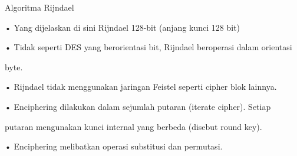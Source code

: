 \documentclass{article}
\begin{document}

Algoritma Rijndael

• Yang dijelaskan di sini Rijndael 128-bit (anjang kunci  128 bit)

• Tidak seperti DES yang berorientasi bit, Rijndael beroperasi dalam orientasi 

byte.

• Rijndael tidak menggunakan jaringan Feistel seperti cipher blok lainnya.

• Enciphering dilakukan dalam sejumlah putaran (iterate cipher). Setiap 

putaran mengunakan kunci internal yang berbeda (disebut round key). 

• Enciphering melibatkan operasi substitusi dan permutasi.
\end{document}
